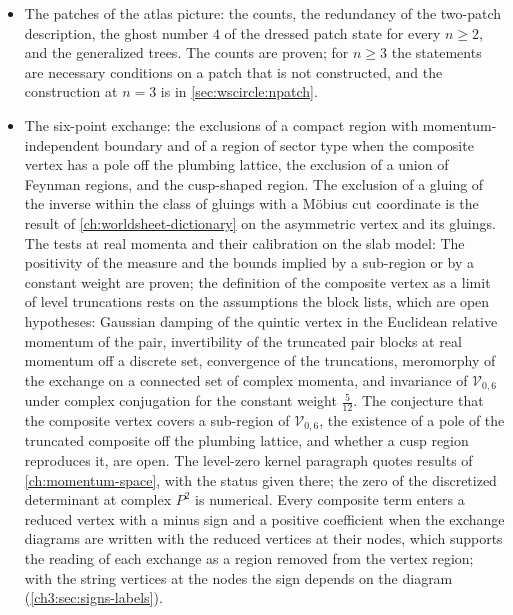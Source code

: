 \begin{itemize}
  \item The patches of the atlas picture: the counts, the redundancy of the two-patch description, the ghost number $4$ of the dressed patch state for every $n \geq 2$, and the generalized trees.
    The counts are proven; for $n \geq 3$ the statements are necessary conditions on a patch that is not constructed, and the construction at $n = 3$ is in \cref{sec:wscircle:npatch}.

  \item The six-point exchange: the exclusions of a compact region with momentum-independent boundary and of a region of sector type when the composite vertex has a pole off the plumbing lattice, the exclusion of a union of Feynman regions, and the cusp-shaped region.
    The exclusion of a gluing of the inverse within the class of gluings with a Möbius cut coordinate is the result of \cref{ch:worldsheet-dictionary} on the asymmetric vertex and its gluings.
    The tests at real momenta and their calibration on the slab model:
    The positivity of the measure and the bounds implied by a sub-region or by a constant weight are proven; the definition of the composite vertex as a limit of level truncations rests on the assumptions the block lists, which are open hypotheses: Gaussian damping of the quintic vertex in the Euclidean relative momentum of the pair, invertibility of the truncated pair blocks at real momentum off a discrete set, convergence of the truncations, meromorphy of the exchange on a connected set of complex momenta, and invariance of $\mathcal V_{0,6}$ under complex conjugation for the constant weight $\tfrac{5}{12}$.
    The conjecture that the composite vertex covers a sub-region of $\mathcal V_{0,6}$, the existence of a pole of the truncated composite off the plumbing lattice, and whether a cusp region reproduces it, are open.
    The level-zero kernel paragraph quotes results of \cref{ch:momentum-space}, with the status given there; the zero of the discretized determinant at complex $P^2$ is numerical.
    Every composite term enters a reduced vertex with a minus sign and a positive coefficient when the exchange diagrams are written with the reduced vertices at their nodes, which supports the reading of each exchange as a region removed from the vertex region; with the string vertices at the nodes the sign depends on the diagram (\cref{ch3:sec:signs-labels}).


\end{itemize}
